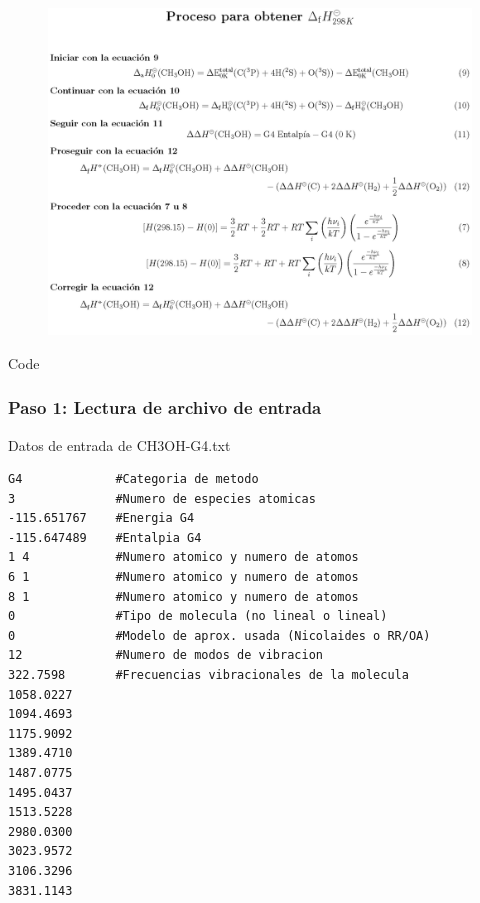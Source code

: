 \documentclass{beamer}
\begin{document}
\begin{frame}

\begin{center}
\begin{figure}[h]
\includegraphics[scale=.5]{images/pe}
\end{figure}
\end{center}
\end{frame}
\begin{frame}[fragile]{Code}
\frametitle{Paso 1: Lectura de archivo de entrada}

\begin{block}{Datos de entrada de CH3OH-G4.txt}
\begin{lstlisting}
G4             #Categoria de metodo
3              #Numero de especies atomicas 
-115.651767    #Energia G4 
-115.647489    #Entalpia G4 
1 4            #Numero atomico y numero de atomos
6 1            #Numero atomico y numero de atomos
8 1            #Numero atomico y numero de atomos
0              #Tipo de molecula (no lineal o lineal)
0              #Modelo de aprox. usada (Nicolaides o RR/OA)
12             #Numero de modos de vibracion
322.7598       #Frecuencias vibracionales de la molecula
1058.0227    
1094.4693
1175.9092
1389.4710
1487.0775
1495.0437
1513.5228
2980.0300
3023.9572
3106.3296
3831.1143
\end{lstlisting}
\end{block}
\end{frame}
\end{document}
